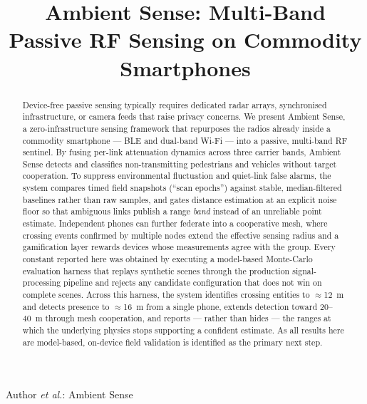 \documentclass[journal,10pt]{IEEEtran}
\begin{document}
\title{Ambient Sense: Multi-Band Passive RF Sensing on Commodity Smartphones}

\author{%
}

%
{Author \MakeLowercase{\textit{et al.}}: Ambient Sense}

\maketitle

\begin{abstract}
Device-free passive sensing typically requires dedicated radar arrays,
synchronised infrastructure, or camera feeds that raise privacy concerns. We
present Ambient Sense, a zero-infrastructure sensing framework that
repurposes the radios already inside a commodity smartphone --- BLE and
dual-band Wi-Fi --- into a passive, multi-band RF sentinel. By fusing
per-link attenuation dynamics across three carrier bands, Ambient Sense
detects and classifies non-transmitting pedestrians and vehicles without
target cooperation. To suppress environmental fluctuation and quiet-link
false alarms, the system compares timed field snapshots (``scan epochs'')
against stable, median-filtered baselines rather than raw samples, and gates
distance estimation at an explicit noise floor so that ambiguous links
publish a range \emph{band} instead of an unreliable point estimate.
Independent phones can further federate into a cooperative mesh, where
crossing events confirmed by multiple nodes extend the effective sensing
radius and a gamification layer rewards devices whose measurements agree
with the group. Every constant reported here was obtained by executing a
model-based Monte-Carlo evaluation harness that replays synthetic scenes
through the production signal-processing pipeline and rejects any candidate
configuration that does not win on complete scenes. Across this harness, the
system identifies crossing entities to $\approx$12~m and detects presence to
$\approx$16~m from a single phone, extends detection toward 20--40~m through
mesh cooperation, and reports --- rather than hides --- the ranges at which
the underlying physics stops supporting a confident estimate. As all results
here are model-based, on-device field validation is identified as the
primary next step.
\end{abstract}
\end{document}
